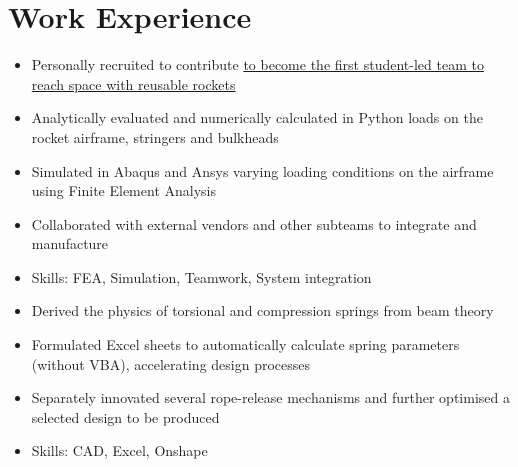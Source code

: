 \documentclass{cv}
\begin{document}
\section{Work Experience}
\begin{subsections}
    \subtitle{Karman Space Programme \hfill London, United Kingdom}
    \begin{itemize}
        \item Personally recruited to contribute \href{https://www.karmanspace.co.uk/}{to become the first student-led team to reach space with reusable rockets}
        \item Analytically evaluated and numerically calculated in Python loads on the rocket airframe, stringers and bulkheads
        \item Simulated in Abaqus and Ansys varying loading conditions on the airframe using Finite Element Analysis
        \item Collaborated with external vendors and other subteams to integrate and manufacture
        \item Skills: FEA, Simulation, Teamwork, System integration
    \end{itemize}

    \subtitle{Guided Systems, DSO National Laboratories \hfill Singapore}
    \begin{itemize}
        \item Derived the physics of torsional and compression springs from beam theory
        \item Formulated Excel sheets to automatically calculate spring parameters (without VBA), accelerating design processes
        \item Separately innovated several rope-release mechanisms and further optimised a selected design to be produced
        \item Skills: CAD, Excel, Onshape
    \end{itemize}


\end{subsections}
\end{document}
